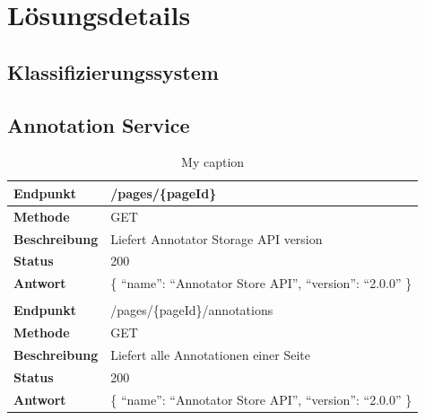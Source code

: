 \chapter{Lösungsdetails}
    \label{chapter:SolutionDetails}


    \section{Klassifizierungssystem}


    \section{Annotation Service}
        \begin{table}[htb]
            \centering
            \begin{tabular}{|l|l|}
            \hline
            \textbf{Endpunkt}     & /pages/\{pageId\}\\
            \hline
            \textbf{Methode}      & GET\\
            \hline
            \textbf{Beschreibung} & Liefert Annotator Storage API version\\
            \hline
            \textbf{Status}       & 200\\
            \hline
            \textbf{Antwort}      & \{ ``name'': ``Annotator Store API'', ``version'': ``2.0.0'' \}\\
            \hline
            & \\
            \hline
            \textbf{Endpunkt}     & /pages/\{pageId\}/annotations\\
            \hline
            \textbf{Methode}      & GET\\
            \hline
            \textbf{Beschreibung} & Liefert alle Annotationen einer Seite\\
            \hline
            \textbf{Status}       & 200\\
            \hline
            \textbf{Antwort}      & \{ ``name'': ``Annotator Store API'', ``version'': ``2.0.0'' \}\\
            \hline
            \end{tabular}
            \caption{My caption}
            \label{my-label}
        \end{table}

